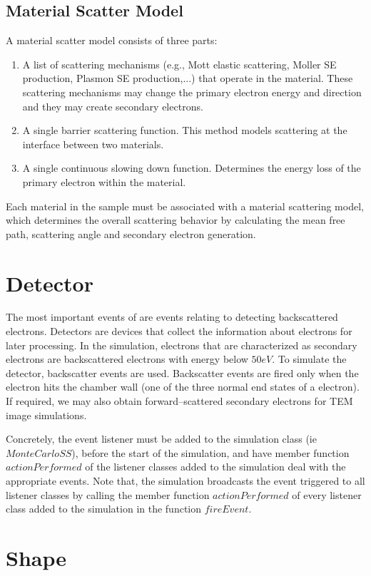 \subsection{Material Scatter Model}
A material scatter model consists of three parts:
\begin{enumerate}
\item A list of scattering mechanisms (e.g., Mott elastic scattering, Moller SE production, Plasmon SE production,...) that operate in the material. These scattering mechanisms may change the primary electron energy and direction and they may create secondary electrons. 
\item A single barrier scattering function. This method models scattering at the interface between two materials. 
\item A single continuous slowing down function. Determines the energy loss of the primary electron within the material. 
\end{enumerate}
Each material in the sample must be associated with a material scattering model, which determines the overall scattering behavior by calculating the mean free path, scattering angle and secondary electron generation. 

\section{Detector}\label{subsec:detector}
The most important events of are events relating to detecting backscattered electrons. Detectors are devices that collect the information about electrons for later processing. In the simulation, electrons that are characterized as secondary electrons are backscattered electrons with energy below $50 eV$. To simulate the detector, backscatter events are used. Backscatter events are fired only when the electron hits the chamber wall (one of the three normal end states of a electron). If required, we may also obtain forward--scattered secondary electrons for TEM image simulations.

Concretely, the event listener must be added to the simulation class (ie $MonteCarloSS$), before the start of the simulation, and have member function $actionPerformed$ of the listener classes added to the simulation deal with the appropriate events. Note that, the simulation broadcasts the event triggered to all listener classes by calling the member function $actionPerformed$ of every listener class added to the simulation in the function $fireEvent$.

\section{Shape}

